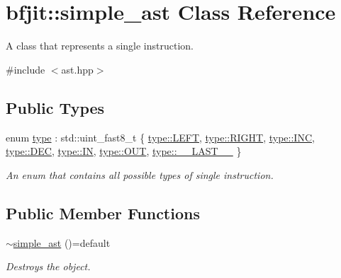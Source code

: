 \hypertarget{classbfjit_1_1simple__ast}{}\section{bfjit\+:\+:simple\+\_\+ast Class Reference}
\label{classbfjit_1_1simple__ast}


A class that represents a single instruction.  




{\ttfamily \#include $<$ast.\+hpp$>$}

\subsection*{Public Types}
\begin{DoxyCompactItemize}
\item 
enum \hyperlink{classbfjit_1_1simple__ast_aa401e9909cc8e86d25144285d64ac32a}{type} \+: std\+::uint\+\_\+fast8\+\_\+t \{ \newline
\hyperlink{classbfjit_1_1simple__ast_aa401e9909cc8e86d25144285d64ac32aa684d325a7303f52e64011467ff5c5758}{type\+::\+L\+E\+FT}, 
\hyperlink{classbfjit_1_1simple__ast_aa401e9909cc8e86d25144285d64ac32aa21507b40c80068eda19865706fdc2403}{type\+::\+R\+I\+G\+HT}, 
\hyperlink{classbfjit_1_1simple__ast_aa401e9909cc8e86d25144285d64ac32aa38924f2227ebf15f4bdc6dca5c5eca91}{type\+::\+I\+NC}, 
\hyperlink{classbfjit_1_1simple__ast_aa401e9909cc8e86d25144285d64ac32aa38344a4d87bb35ec197f26fad338b6ab}{type\+::\+D\+EC}, 
\newline
\hyperlink{classbfjit_1_1simple__ast_aa401e9909cc8e86d25144285d64ac32aac86ee0d9d7ed3e7b4fdbf486fa6c0ebb}{type\+::\+IN}, 
\hyperlink{classbfjit_1_1simple__ast_aa401e9909cc8e86d25144285d64ac32aaef373774188a51f80463f37b6bd9e83a}{type\+::\+O\+UT}, 
\hyperlink{classbfjit_1_1simple__ast_aa401e9909cc8e86d25144285d64ac32aa62bd5a4afef994ba01e631cbf00f85be}{type\+::\+\_\+\+\_\+\+L\+A\+S\+T\+\_\+\+\_\+}
 \}\begin{DoxyCompactList}\small\item\em An enum that contains all possible types of single instruction. \end{DoxyCompactList}
\end{DoxyCompactItemize}
\subsection*{Public Member Functions}
\begin{DoxyCompactItemize}
\item 
\hypertarget{classbfjit_1_1simple__ast_a6109a4b2bc6a4fe40c7f5862f97e2f8a}{}\label{classbfjit_1_1simple__ast_a6109a4b2bc6a4fe40c7f5862f97e2f8a} 
\hyperlink{classbfjit_1_1simple__ast_a6109a4b2bc6a4fe40c7f5862f97e2f8a}{$\sim$simple\+\_\+ast} ()=default
\begin{DoxyCompactList}\small\item\em Destroys the object. \end{DoxyCompactList}\end{DoxyCompactItemize}


